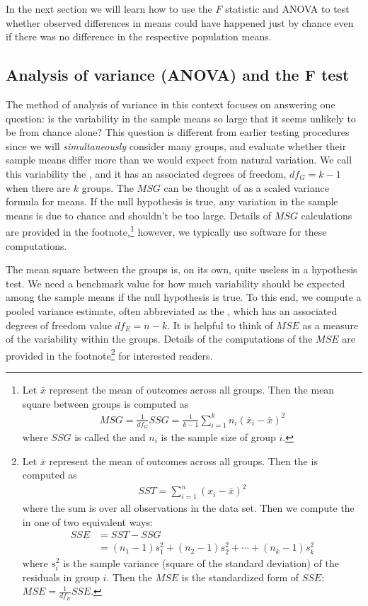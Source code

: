 In the next section we will learn how to use the $F$ statistic and ANOVA to test whether observed differences in means could have happened just by chance even if there was no difference in the respective population means.


\subsection{Analysis of variance (ANOVA) and the F test}

The method of analysis of variance in this context focuses on answering one question: is the variability in the sample means so large that it seems unlikely to be from chance alone? This question is different from earlier testing procedures since we will \emph{simultaneously} consider many groups, and evaluate whether their sample means differ more than we would expect from natural variation. We call this variability the , and it has an associated degrees of freedom, $df_{G}=k-1$ when there are $k$ groups. The $MSG$ can be thought of as a scaled variance formula for means. If the null hypothesis is true, any variation in the sample means is due to chance and shouldn't be too large. Details of $MSG$ calculations are provided in the footnote,\footnote{Let $\bar{x}$ represent the mean of outcomes across all groups. Then the mean square between groups is computed as
\begin{align*}
MSG = \frac{1}{df_{G}}SSG = \frac{1}{k-1}\sum_{i=1}^{k} n_{i}\left(\bar{x}_{i} - \bar{x}\right)^2
\end{align*}
where $SSG$ is called the  and $n_{i}$ is the sample size of group $i$.} however, we typically use software for these computations.

The mean square between the groups is, on its own, quite useless in a hypothesis test. We need a benchmark value for how much variability should be expected among the sample means if the null hypothesis is true. To this end, we compute a pooled variance estimate, often abbreviated as the , which has an associated degrees of freedom value $df_E=n-k$. It is helpful to think of $MSE$ as a measure of the variability within the groups. Details of the computations of the $MSE$ are provided in the footnote\footnote{Let $\bar{x}$ represent the mean of outcomes across all groups. Then the  is computed as
\begin{align*}
SST = \sum_{i=1}^{n} \left(x_{i} - \bar{x}\right)^2
\end{align*}
where the sum is over all observations in the data set. Then we compute the  in one of two equivalent ways:
\begin{align*}
SSE &= SST - SSG \\
	&= (n_1-1)s_1^2 + (n_2-1)s_2^2 + \cdots + (n_k-1)s_k^2
\end{align*}
where $s_i^2$ is the sample variance (square of the standard deviation) of the residuals in group $i$. Then the $MSE$ is the standardized form of $SSE$: $MSE = \frac{1}{df_{E}}SSE$.} for interested readers.

